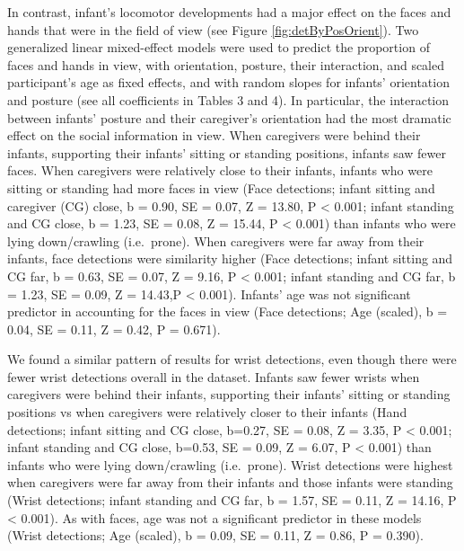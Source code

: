 \documentclass[english,man]{apa6}
\begin{document}
In contrast, infant's locomotor developments had a major effect on the
faces and hands that were in the field of view (see Figure
\ref{fig:detByPosOrient}). Two generalized linear mixed-effect models
were used to predict the proportion of faces and hands in view, with
orientation, posture, their interaction, and scaled participant's age as
fixed effects, and with random slopes for infants' orientation and
posture (see all coefficients in Tables 3 and 4). In particular, the
interaction between infants' posture and their caregiver's orientation
had the most dramatic effect on the social information in view. When
caregivers were behind their infants, supporting their infants' sitting
or standing positions, infants saw fewer faces. When caregivers were
relatively close to their infants, infants who were sitting or standing
had more faces in view (Face detections; infant sitting and caregiver
(CG) close, b = 0.90, SE = 0.07, Z = 13.80, P \textless{} 0.001; infant
standing and CG close, b = 1.23, SE = 0.08, Z = 15.44, P \textless{}
0.001) than infants who were lying down/crawling (i.e.~prone). When
caregivers were far away from their infants, face detections were
similarity higher (Face detections; infant sitting and CG far, b = 0.63,
SE = 0.07, Z = 9.16, P \textless{} 0.001; infant standing and CG far, b
= 1.23, SE = 0.09, Z = 14.43,P \textless{} 0.001). Infants' age was not
significant predictor in accounting for the faces in view (Face
detections; Age (scaled), b = 0.04, SE = 0.11, Z = 0.42, P = 0.671).

We found a similar pattern of results for wrist detections, even though
there were fewer wrist detections overall in the dataset. Infants saw
fewer wrists when caregivers were behind their infants, supporting their
infants' sitting or standing positions vs when caregivers were
relatively closer to their infants (Hand detections; infant sitting and
CG close, b=0.27, SE = 0.08, Z = 3.35, P \textless{} 0.001; infant
standing and CG close, b=0.53, SE = 0.09, Z = 6.07, P \textless{} 0.001)
than infants who were lying down/crawling (i.e.~prone). Wrist detections
were highest when caregivers were far away from their infants and those
infants were standing (Wrist detections; infant standing and CG far, b =
1.57, SE = 0.11, Z = 14.16, P \textless{} 0.001). As with faces, age was
not a significant predictor in these models (Wrist detections; Age
(scaled), b = 0.09, SE = 0.11, Z = 0.86, P = 0.390).
\end{document}
